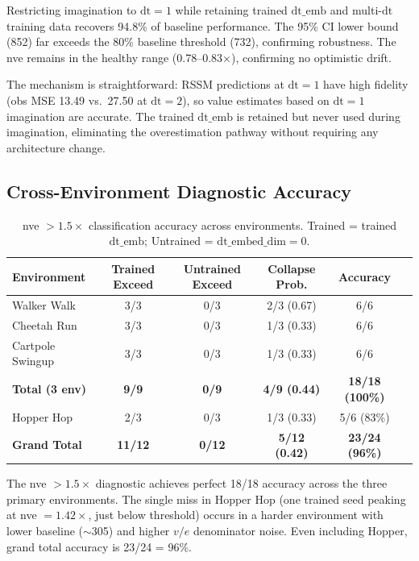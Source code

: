 \documentclass[10pt,letterpaper]{article}
\newcommand{\dt}{\mathrm{dt}}
\begin{document}
Restricting imagination to $\dt=1$ while retaining trained $\dt\_\text{emb}$ and multi-$\dt$ training data recovers 94.8\% of baseline performance.
The 95\% CI lower bound (852) far exceeds the 80\% baseline threshold (732), confirming robustness.
The nve remains in the healthy range (0.78--0.83$\times$), confirming no optimistic drift.

The mechanism is straightforward: RSSM predictions at $\dt=1$ have high fidelity (obs MSE 13.49 vs.\ 27.50 at $\dt=2$), so value estimates based on $\dt=1$ imagination are accurate.
The trained $\dt\_\text{emb}$ is retained but never used during imagination, eliminating the overestimation pathway without requiring any architecture change.

\subsection{Cross-Environment Diagnostic Accuracy}
\label{sec:classification}

\begin{table}[h]
\centering
\caption{nve $> 1.5\times$ classification accuracy across environments. Trained = trained $\dt\_\text{emb}$; Untrained = $\dt\_\text{embed\_dim}=0$.}
\label{tab:classification}
\begin{tabular}{lccccc}
\toprule
Environment & Trained Exceed & Untrained Exceed & Collapse Prob. & Accuracy \\
\midrule
Walker Walk       & 3/3 & 0/3 & 2/3 (0.67) & 6/6 \\
Cheetah Run       & 3/3 & 0/3 & 1/3 (0.33) & 6/6 \\
Cartpole Swingup  & 3/3 & 0/3 & 1/3 (0.33) & 6/6 \\
\midrule
\textbf{Total (3 env)} & \textbf{9/9} & \textbf{0/9} & \textbf{4/9 (0.44)} & \textbf{18/18 (100\%)} \\
\midrule
Hopper Hop        & 2/3 & 0/3 & 1/3 (0.33) & 5/6 (83\%) \\
\midrule
\textbf{Grand Total}   & \textbf{11/12} & \textbf{0/12} & \textbf{5/12 (0.42)} & \textbf{23/24 (96\%)} \\
\bottomrule
\end{tabular}
\end{table}

The nve $> 1.5\times$ diagnostic achieves perfect 18/18 accuracy across the three primary environments.
The single miss in Hopper Hop (one trained seed peaking at nve $= 1.42\times$, just below threshold) occurs in a harder environment with lower baseline ($\sim$305) and higher $v/e$ denominator noise.
Even including Hopper, grand total accuracy is 23/24 = 96\%.
\end{document}

